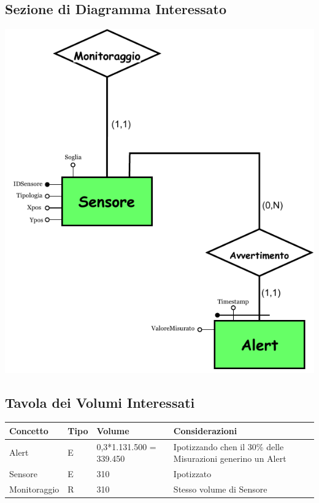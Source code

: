 \documentclass[12pt,a4paper]{report}
\begin{document}
        \subsection{Sezione di Diagramma Interessato}
        \begin{center}
            \includegraphics{sezione_operazione7.pdf}
        \end{center}

        \subsection{Tavola dei Volumi Interessati}
        \begin{tabular}{|p{4cm}|p{1cm}|p{3cm}|p{8cm}|}
            \hline
            \textbf{Concetto} & \textbf{Tipo} & \textbf{Volume} & \textbf{Considerazioni} \\ \hline
            Alert & E & 0,3*1.131.500 = 339.450 & Ipotizzando chen il 30\% delle Misurazioni generino un Alert \\ \hline
            Sensore & E & 310 & Ipotizzato \\ \hline
            Monitoraggio & R & 310 & Stesso volume di Sensore \\ \hline
        \end{tabular}
\end{document}
